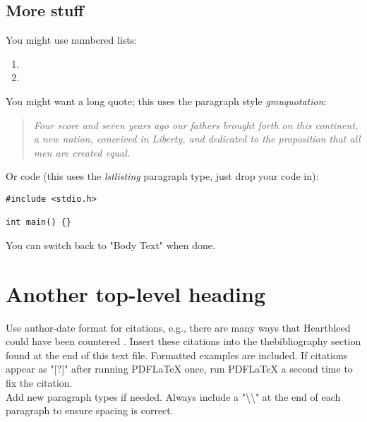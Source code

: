 \documentclass[12pt]{article}
\newenvironment{gmuquotation}{%
\begin{quote} \it}
{\end{quote}}
\begin{document}
\subsection{More stuff}

You might use numbered lists:

\begin{enumerate}
    \item \lipsum[1] 
    \item \lipsum[2] 
\end{enumerate}

You might want a long quote; this uses the paragraph style \textit{gmuquotation}: 

\begin{gmuquotation}
    Four score and seven years ago our fathers brought forth on this continent, a new nation, conceived in Liberty, and dedicated to the proposition that all men are created equal. \cite{Lincoln:1863}
\end{gmuquotation}

Or code (this uses the \textit{lstlisting} paragraph type, just drop your code in): \\

\begin{lstlisting}
#include <stdio.h>

int main() {} 

\end{lstlisting} 

You can switch back to "Body Text" when done. \\


\section{Another top-level heading}

Use author-date format for citations, e.g., there are many ways that Heartbleed could have been countered \cite{Wheeler:2014}.  Insert these citations into the thebibliography section found at the end of this text file.  Formatted examples are included.  If citations appear as "[?]" after running PDFLaTeX once, run PDFLaTeX a second time to fix the citation.\\

Add new paragraph types if needed.  Always include a "{\textbackslash}{\textbackslash}" at the end of each paragraph to ensure spacing is correct. \\

\lipsum[1]


\end{document}
